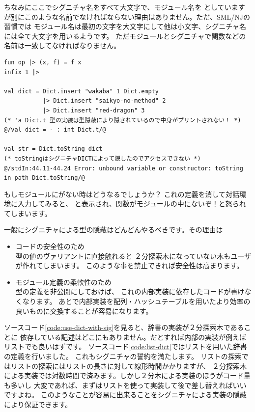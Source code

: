 \documentclass[11pt,a4paper]{article}
\begin{document}
ちなみにここでシグニチャ名をすべて大文字で、モジュール名を
としていますが別にこのような名前でなければならない理由はありません。ただ、SML/NJの習慣では
モジュール名は最初の文字を大文字にして他は小文字、シグニチャ名には全て大文字を用いるようです。
ただモジュールとシグニチャで関数などの名前は一致してなければなりません。

\begin{lstlisting}[caption=\prog{Dict}を使おう,label=code:use-dict-with-sig]
fun op |> (x, f) = f x
infix 1 |>

val dict = Dict.insert "wakaba" 1 Dict.empty
           |> Dict.insert "saikyo-no-method" 2
           |> Dict.insert "red-dragon" 3
(* 'a Dict.t 型の実装は型隠蔽により隠されているので中身がプリントされない！ *)
@/val dict = - : int Dict.t/@

val str = Dict.toString dict
(* toStringはシグニチャDICTによって隠したのでアクセスできない *)
@/stdIn:44.11-44.24 Error: unbound variable or constructor: toString in path Dict.toString/@
\end{lstlisting}

もしモジュールにがない時はどうなるでしょうか？
これの定義を消して対話環境に入力してみると、
と表示され、関数がモジュールの中にないぞ！と怒られてしまいます。

一般にシグニチャによる型の隠蔽はどんどんやるべきです。その理由は
\begin{itemize}
\item コードの安全性のため\\
  型の値のヴァリアントに直接触れると
  ２分探索木になっていない木もユーザが作れてしまいます。
  このような事を禁止できれば安全性は高まります。
\item モジュール定義の柔軟性のため\\
  型の定義を非公開にしておけば、
これの内部実装に依存したコードが書けなくなります。
あとで内部実装を配列・ハッシュテーブルを用いたより効率の良いものに交換することが容易になります。
\end{itemize}

ソースコード\ref{code:use-dict-with-sig}を見ると、辞書の実装が２分探索木であることに
依存している記述はどこにもありません。だとすれば内部の実装が例えばリストでも良いはずです。
ソースコード\ref{code:list-dict}ではリストを用いた辞書の定義を行いました。
これもシグニチャの誓約を満たします。
リストの探索ではリストの探索にはリストの長さに対して線形時間かかりますが、
２分探索木による実装では対数時間で済みます。しかし２分木による実装のほうがコード量も多いし
大変であれば、まずはリストを使って実装して後で差し替えればいいですよね。
このようなことが容易に出来ることをシグニチャによる実装の隠蔽により保証できます。
\end{document}
